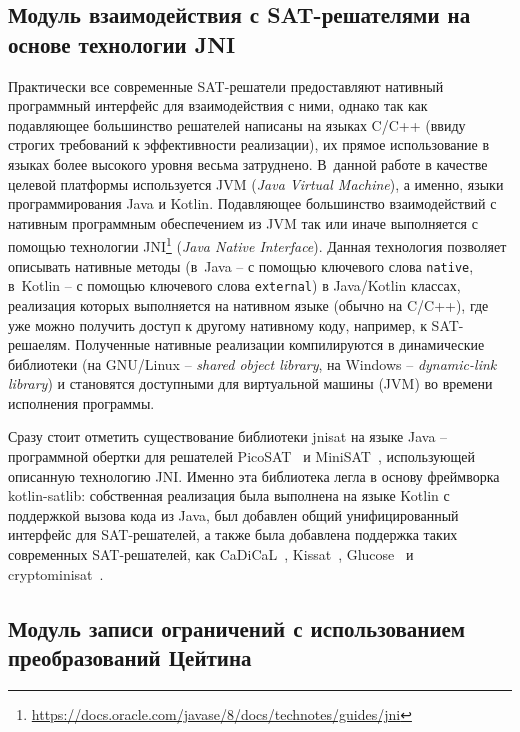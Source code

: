\subsection{Модуль взаимодействия с SAT-решателями на основе технологии JNI}

Практически все современные SAT-решатели предоставляют нативный программный интерфейс для взаимодействия с ними, однако так как подавляющее большинство решателей написаны на языках C/C++ (ввиду строгих требований к эффективности реализации), их прямое использование в языках более высокого уровня весьма затруднено.
В~данной работе в качестве целевой платформы используется JVM (\textit{Java Virtual Machine}), а именно, языки программирования Java и Kotlin.
Подавляющее большинство взаимодействий с нативным программным обеспечением из JVM так или иначе выполняется с помощью технологии JNI\footnote{\href{https://docs.oracle.com/javase/8/docs/technotes/guides/jni/}{https://docs.oracle.com/javase/8/docs/technotes/guides/jni}} (\textit{Java Native Interface}).
Данная технология позволяет описывать нативные методы (в~Java \--- с помощью ключевого слова \texttt{native}, в~Kotlin \--- с помощью ключевого слова \texttt{external}) в Java/Kotlin классах, реализация которых выполняется на нативном языке (обычно на C/C++), где уже можно получить доступ к другому нативному коду, например, к SAT-решаелям.
Полученные нативные реализации компилируются в динамические библиотеки (на GNU/Linux \--- \textit{shared object library}, на Windows \--- \textit{dynamic-link library}) и становятся доступными для виртуальной машины (JVM) во времени исполнения программы.

Сразу стоит отметить существование библиотеки jnisat на языке Java \--- программной обертки для решателей PicoSAT~\cite{biere2008} и MiniSAT~\cite{minisat}, использующей описанную технологию JNI.
Именно эта библиотека легла в основу фреймворка kotlin-satlib: собственная реализация была выполнена на языке Kotlin с поддержкой вызова кода из Java, был добавлен общий унифицированный интерфейс для SAT-решателей, а также была добавлена поддержка таких современных SAT-решателей, как CaDiCaL~\cite{cadical}, Kissat~\cite{kissat}, Glucose~\cite{glucose} и cryptominisat~\cite{cryptominisat}.

\subsection{Модуль записи ограничений с использованием преобразований Цейтина}

